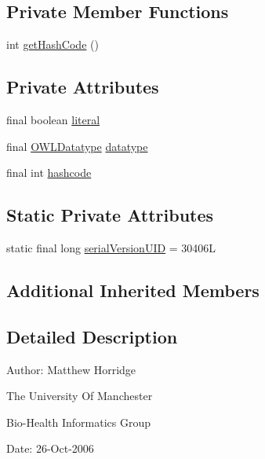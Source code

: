 \subsection*{Private Member Functions}
\begin{DoxyCompactItemize}
\item 
int \hyperlink{classuk_1_1ac_1_1manchester_1_1cs_1_1owl_1_1owlapi_1_1_o_w_l_literal_impl_boolean_a63f9b5c281b795e65163d9ec7c7e0fc4}{get\-Hash\-Code} ()
\end{DoxyCompactItemize}
\subsection*{Private Attributes}
\begin{DoxyCompactItemize}
\item 
final boolean \hyperlink{classuk_1_1ac_1_1manchester_1_1cs_1_1owl_1_1owlapi_1_1_o_w_l_literal_impl_boolean_accf40804ce4aca981a4c1be331d02807}{literal}
\item 
final \hyperlink{interfaceorg_1_1semanticweb_1_1owlapi_1_1model_1_1_o_w_l_datatype}{O\-W\-L\-Datatype} \hyperlink{classuk_1_1ac_1_1manchester_1_1cs_1_1owl_1_1owlapi_1_1_o_w_l_literal_impl_boolean_ade5183494eb66a501b470e8c46170415}{datatype}
\item 
final int \hyperlink{classuk_1_1ac_1_1manchester_1_1cs_1_1owl_1_1owlapi_1_1_o_w_l_literal_impl_boolean_afaa39d1363bdb301a09f9bc6ca1f5961}{hashcode}
\end{DoxyCompactItemize}
\subsection*{Static Private Attributes}
\begin{DoxyCompactItemize}
\item 
static final long \hyperlink{classuk_1_1ac_1_1manchester_1_1cs_1_1owl_1_1owlapi_1_1_o_w_l_literal_impl_boolean_a25752ddbccf9fe351f6d856652b2d404}{serial\-Version\-U\-I\-D} = 30406\-L
\end{DoxyCompactItemize}
\subsection*{Additional Inherited Members}


\subsection{Detailed Description}
Author\-: Matthew Horridge\par
 The University Of Manchester\par
 Bio-\/\-Health Informatics Group\par
 Date\-: 26-\/\-Oct-\/2006\par
 \par
 

